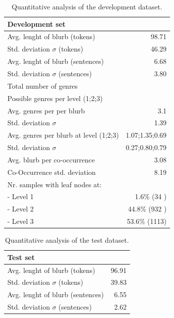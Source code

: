 \documentclass[11pt,a4paper]{article}
\begin{document}
\begin{table}
\small
\begin{center}
\begin{tabular}{|l|r|}
\hline\centering\textbf{Development set}  &             \\
\hline
Avg. lenght of blurb (tokens)              &   98.71        \\
Std. deviation $\sigma$ (tokens)           &   46.29        \\
Avg. lenght of blurb (sentences)           &   6.68         \\
Std. deviation $\sigma$ (sentences)        &   3.80         \\
\hline
Total number of genres                     &                   \\
Possible genres per level (1;2;3)          &                   \\
Avg. genres per per blurb                  &   3.1             \\
Std. deviation $\sigma$                    &   1.39            \\
Avg. genres per blurb at level (1;2;3)     &   1.07;1.35;0.69  \\
Std. deviation $\sigma$                    &   0.27;0.80;0.79  \\
\hline
Avg. blurb per co-occurrence               &   3.08            \\
Co-Occurrence std. deviation               &   8.19            \\
\hline
Nr. samples with leaf nodes at:            &                   \\
 - Level 1                                 &    1.6\% (34 )    \\
 - Level 2                                 &    44.8\% (932 )  \\
 - Level 3                                 &    53.6\% (1113)  \\
\hline
\end{tabular}
\end{center}
\caption{\label{quantitivy-analysis-train}Quantitative analysis of the development dataset.}
\end{table}


\begin{table}
\small
\begin{center}
\begin{tabular}{|l|r|}
\hline\centering\textbf{Test set}  &         \\
\hline
Avg. lenght of blurb (tokens)              &  96.91             \\
Std. deviation $\sigma$ (tokens)           &  39.83             \\
Avg. lenght of blurb (sentences)           &  6.55              \\
Std. deviation $\sigma$ (sentences)        &  2.62              \\
\hline
\end{tabular}
\end{center}
\caption{\label{quantitivy-analysis-dev}Quantitative analysis of the test dataset.}
\end{table}
\end{document}
